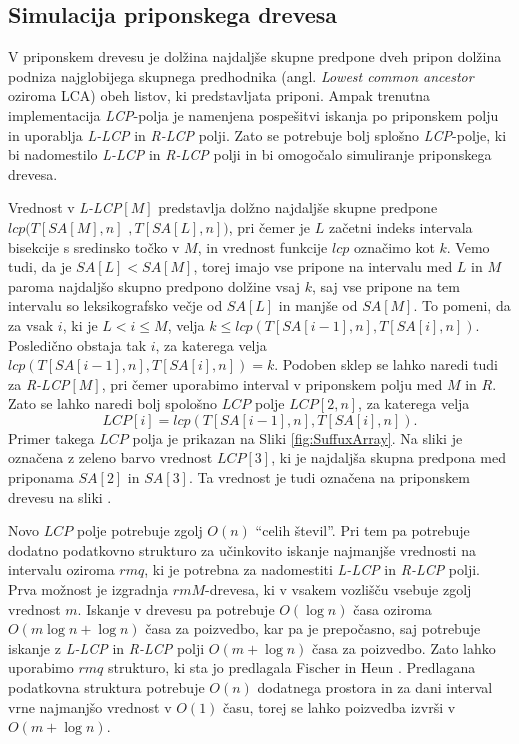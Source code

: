 \subsection{Simulacija priponskega drevesa}\label{sec:STsimulacija}
V priponskem drevesu je dolžina najdaljše skupne predpone dveh pripon dolžina podniza najglobijega skupnega predhodnika (angl. \textit{Lowest common ancestor} oziroma LCA) obeh listov, ki predstavljata priponi. Ampak trenutna implementacija \textit{LCP}-polja je namenjena pospešitvi iskanja po priponskem polju in uporablja \textit{L-LCP} in \textit{R-LCP} polji. Zato se potrebuje bolj splošno \textit{LCP}-polje, ki bi nadomestilo \textit{L-LCP} in \textit{R-LCP} polji in bi omogočalo simuliranje priponskega drevesa.

Vrednost v \textit{L-LCP}$[M]$ predstavlja dolžno najdaljše skupne predpone $lcp(T[SA[M], n]$ $,T[SA[L], n])$, pri čemer je $L$ začetni indeks intervala bisekcije s sredinsko točko v $M$, in vrednost funkcije $lcp$ označimo kot $k$. Vemo tudi, da je $SA[L]<SA[M]$, torej imajo vse pripone na intervalu med $L$ in $M$ paroma najdaljšo skupno predpono dolžine vsaj $k$, saj vse pripone na tem intervalu so leksikografsko večje od $SA[L]$ in manjše od $SA[M]$. To pomeni, da za vsak $i$, ki je $L<i\le M$, velja $k\le lcp(T[SA[i-1], n], T[SA[i], n])$. Posledično obstaja tak $i$, za katerega velja $lcp(T[SA[i-1], n], T[SA[i], n])=k$. Podoben sklep se lahko naredi tudi za \textit{R-LCP}$[M]$, pri čemer uporabimo interval v priponskem polju med $M$ in $R$. Zato se lahko naredi bolj spološno $LCP$ polje $LCP[2,n]$, za katerega velja
$$
    LCP[i]=lcp(T[SA[i-1], n], T[SA[i], n]).
$$
Primer takega $LCP$ polja je prikazan na Sliki \ref{fig:SuffuxArray}. Na sliki je označena z zeleno barvo vrednost $LCP[3]$, ki je najdaljša skupna predpona med priponama $SA[2]$ in $SA[3]$. Ta vrednost je tudi označena na priponskem drevesu na sliki \cite{Abouelhoda2004, Kasai2001}.

Novo $LCP$ polje potrebuje zgolj $O(n)$ \enquote{celih števil}. Pri tem pa potrebuje dodatno podatkovno strukturo za učinkovito iskanje najmanjše vrednosti na intervalu oziroma $rmq$, ki je potrebna za nadomestiti \textit{L-LCP} in \textit{R-LCP} polji. Prva možnost je izgradnja $rmM$-drevesa, ki v vsakem vozlišču vsebuje zgolj vrednost $m$. Iskanje v drevesu pa potrebuje $O(\log{n})$ časa oziroma $O(m\log{n}+\log{n})$ časa za poizvedbo, kar pa je prepočasno, saj potrebuje iskanje z \textit{L-LCP} in \textit{R-LCP} polji $O(m+\log{n})$ časa za poizvedbo. Zato lahko uporabimo $rmq$ strukturo, ki sta jo predlagala Fischer in Heun \cite{Fischer2007}. Predlagana podatkovna struktura potrebuje $O(n)$ dodatnega prostora in za dani interval vrne najmanjšo vrednost v $O(1)$ času, torej se lahko poizvedba izvrši v $O(m+\log{n})$.

